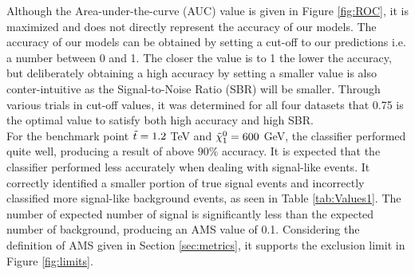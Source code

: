 Although the Area-under-the-curve (AUC) value is given in Figure \ref{fig:ROC}, it is maximized and does not directly represent the accuracy of our models. The accuracy of our models can be obtained by setting a cut-off to our predictions i.e. a number between 0 and 1. The closer the value is to 1 the lower the accuracy, but deliberately obtaining a high accuracy by setting a smaller value is also conter-intuitive as the Signal-to-Noise Ratio (SBR) will be smaller. Through various trials in cut-off values, it was determined for all four datasets that 0.75 is the optimal value to satisfy both high accuracy and high SBR. \\

For the benchmark point $\Tilde{t} = 1.2$ TeV and $\Tilde{\chi}_1^0 = 600$ GeV, the classifier performed quite well, producing a result of above $90\%$ accuracy. It is expected that the classifier performed less accurately when dealing with signal-like events. It correctly identified a smaller portion of true signal events and incorrectly classified more signal-like background events, as seen in Table \ref{tab:Values1}. The number of expected number of signal is significantly less than the expected number of background, producing an AMS value of 0.1. Considering the definition of AMS given in Section \ref{sec:metrics}, it supports the exclusion limit in Figure \ref{fig:limits}. \\

